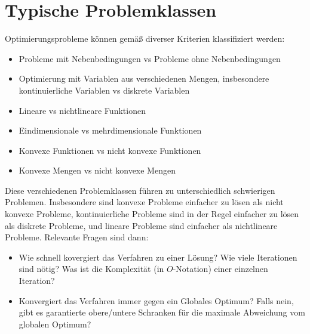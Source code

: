 \documentclass{report}
\begin{document}
\section{Typische Problemklassen}
Optimierungsprobleme können gemäß diverser Kriterien klassifiziert werden:
\begin{itemize}
 \item Probleme mit Nebenbedingungen vs Probleme ohne Nebenbedingungen
 \item Optimierung mit Variablen aus verschiedenen Mengen, insbesondere kontinuierliche Variablen vs diskrete Variablen
 \item Lineare vs nichtlineare Funktionen
 \item Eindimensionale vs mehrdimensionale Funktionen
 \item Konvexe Funktionen vs nicht konvexe Funktionen
 \item Konvexe Mengen vs nicht konvexe Mengen
\end{itemize}
Diese verschiedenen Problemklassen führen zu unterschiedlich schwierigen Problemen. Insbesondere sind konvexe Probleme einfacher zu lösen als nicht konvexe Probleme, kontinuierliche Probleme sind in der Regel einfacher zu lösen als diskrete Probleme, und lineare Probleme sind einfacher als nichtlineare Probleme. Relevante Fragen sind dann:
\begin{itemize}
 \item Wie schnell kovergiert das Verfahren zu einer Lösung? Wie viele Iterationen sind nötig? Was ist die Komplexität (in $O$-Notation) einer einzelnen Iteration?
 \item Konvergiert das Verfahren immer gegen ein Globales Optimum? Falls nein, gibt es garantierte obere/untere Schranken für die maximale Abweichung vom globalen Optimum?
\end{itemize}
\end{document}

